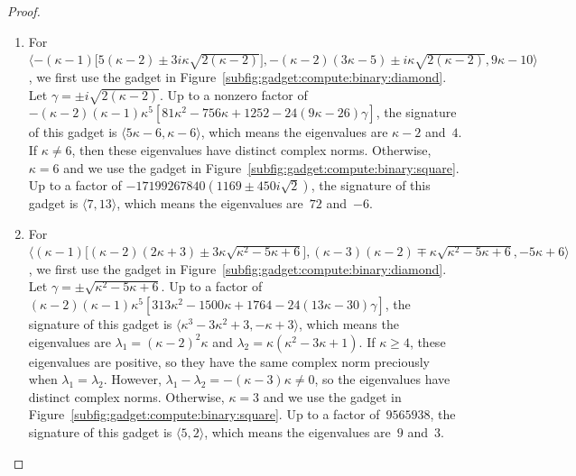 \documentclass[11pt]{article}
\begin{document}
\begin{proof}
\begin{enumerate}
  \item For $\langle -(\kappa - 1) \big[5 (\kappa - 2) \pm 3 i \kappa \sqrt{2 (\kappa - 2)}\big], -(\kappa - 2) (3 \kappa - 5) \pm i \kappa \sqrt{2 (\kappa - 2)}, 9 \kappa - 10 \rangle$,
  we first use the gadget in Figure~\ref{subfig:gadget:compute:binary:diamond}.
  Let $\gamma = \pm i \sqrt{2 (\kappa - 2)}$.
  Up to a nonzero factor of $-(\kappa - 2) (\kappa - 1) \kappa^5 [81 \kappa^2 - 756 \kappa + 1252 - 24 (9 \kappa - 26) \gamma]$,
  the signature of this gadget is $\langle 5 \kappa - 6, \kappa - 6 \rangle$,
  which means the eigenvalues are $\kappa - 2$ and~$4$.
  If $\kappa \ne 6$,
  then these eigenvalues have distinct complex norms.
  Otherwise, $\kappa = 6$ and we use the gadget in Figure~\ref{subfig:gadget:compute:binary:square}.
  Up to a factor of $-17199267840 (1169 \pm 450 i \sqrt{2})$,
  the signature of this gadget is $\langle 7, 13\rangle$,
  which means the eigenvalues are~$72$ and~$-6$.
  
  \item For $\langle (\kappa - 1) \big[(\kappa - 2) (2 \kappa + 3) \pm 3 \kappa \sqrt{\kappa^2 - 5 \kappa + 6}\big], (\kappa - 3) (\kappa - 2) \mp \kappa \sqrt{\kappa^2 - 5 \kappa + 6}, -5 \kappa + 6 \rangle$,
  we first use the gadget in Figure~\ref{subfig:gadget:compute:binary:diamond}.
  Let $\gamma = \pm \sqrt{\kappa^2 - 5 \kappa + 6}$.
  Up to a factor of $(\kappa - 2) (\kappa - 1) \kappa^5 [313 \kappa^2 - 1500 \kappa + 1764 -24 (13 \kappa - 30) \gamma]$,
  the signature of this gadget is $\langle \kappa^3 - 3 \kappa^2 + 3, -\kappa + 3\rangle$,
  which means the eigenvalues are $\lambda_1 = (\kappa - 2)^2 \kappa$ and $\lambda_2 = \kappa (\kappa^2 - 3 \kappa + 1)$.
  If $\kappa \ge 4$,
  these eigenvalues are positive,
  so they have the same complex norm preciously when $\lambda_1 = \lambda_2$.
  However, $\lambda_1 - \lambda_2 = - (\kappa - 3) \kappa \ne 0$,
  so the eigenvalues have distinct complex norms.
  Otherwise, $\kappa = 3$ and we use the gadget in Figure~\ref{subfig:gadget:compute:binary:square}.
  Up to a factor of~$9565938$,
  the signature of this gadget is $\langle 5,2 \rangle$,
  which means the eigenvalues are~$9$ and~$3$.
  

\end{enumerate}
\end{proof}
\end{document}

